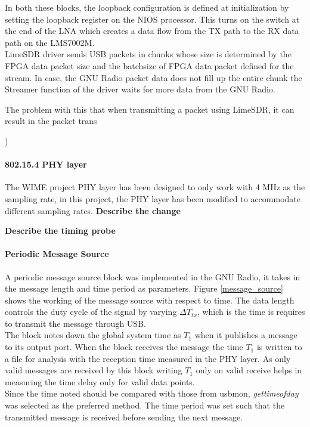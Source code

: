 In both these blocks, the loopback configuration is defined at initialization by setting the loopback register on the NIOS processor.
This turns on the switch at the end of the \ac{LNA} which creates a data flow from the TX path to the RX data path on the LMS7002M.\\

LimeSDR driver sends USB packets in chunks whose size is determined by the FPGA data packet size and the batchsize of FPGA data packet defined for the stream.
In case, the GNU Radio packet data does not fill up the entire chunk the Streamer function of the driver waits for more data from the GNU Radio.

The problem with this that when transmitting a packet using LimeSDR, it can result in the packet trans

)
    
\paragraph{802.15.4 \ac{PHY} layer}

The WIME project \ac{PHY} layer has been designed to only work with 4 MHz as the sampling rate, in this project, the \ac{PHY} layer has been modified to accommodate different sampling rates. \textbf{Describe the change}

\textbf{Describe the timing probe}
\paragraph{Periodic Message Source}

A periodic message source block was implemented in the GNU Radio, it takes in the message length and time period as parameters. Figure \ref{message_source} shows the working of the message source with respect to time. The data length controls the duty cycle of the signal by varying $\Delta T_{tx}$, which is the time is requires to transmit the message through USB.\\

The block notes down the global system time as $T_1$ when it publishes a message to its output port. When the block receives the message the time $T_1$ is written to a file for analysis with the reception time measured in the \ac{PHY} layer. As only valid messages are received by this block writing $T_1$ only on valid receive helps in measuring the time delay only for valid data points.\\

Since the time noted should be compared with those from usbmon, \textit{gettimeofday} was selected as the preferred method. The time period was set such that the transmitted message is received before sending the next message.\\

